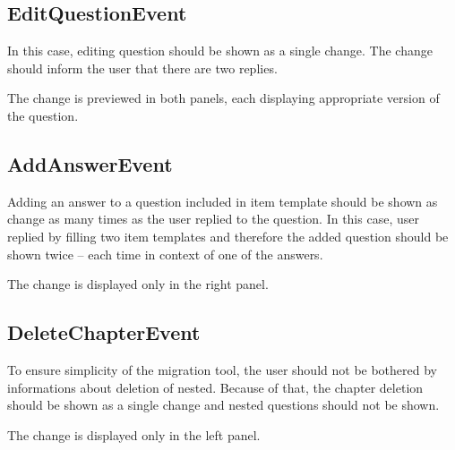 \subsection*{EditQuestionEvent}

In this case, editing question should be shown as a single change.
The change should inform the user that there are two replies.

The change is previewed in both panels, each displaying appropriate version of the question.

\subsection*{AddAnswerEvent}

Adding an answer to a question included in item template should be shown as change as many times as the user replied to the question.
In this case, user replied by filling two item templates and therefore the added question should be shown twice -- each time in context of one of the answers.

The change is displayed only in the right panel.

\subsection*{DeleteChapterEvent}

To ensure simplicity of the migration tool, the user should not be bothered by informations about deletion of nested.
Because of that, the chapter deletion should be shown as a single change and nested questions should not be shown.

The change is displayed only in the left panel.

